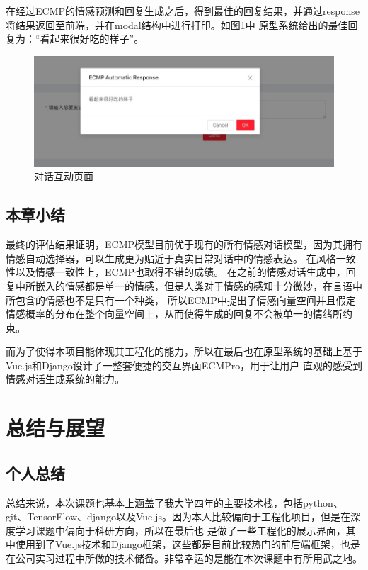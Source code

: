 \documentclass[supercite]{HustGraduPaper}
\theoremstyle{definition}
\begin{document}
在经过ECMP的情感预测和回复生成之后，得到最佳的回复结果，并通过response将结果返回至前端，并在modal结构中进行打印。如图\ref{Fig.chatresponse}中
原型系统给出的最佳回复为：“看起来很好吃的样子”。
\begin{figure}[H] %
  \centering %
  \includegraphics[width=1\textwidth]{images/chatresponse.jpg} %
  \caption{对话互动页面} %
  \label{Fig.chatresponse} %
\end{figure}

\subsection{本章小结}
最终的评估结果证明，ECMP模型目前优于现有的所有情感对话模型，因为其拥有情感自动选择器，可以生成更为贴近于真实日常对话中的情感表达。
在风格一致性以及情感一致性上，ECMP也取得不错的成绩。
在之前的情感对话生成中，回复中所嵌入的情感都是单一的情感，但是人类对于情感的感知十分微妙，在言语中所包含的情感也不是只有一个种类，
所以ECMP中提出了情感向量空间并且假定情感概率的分布在整个向量空间上，从而使得生成的回复不会被单一的情绪所约束。

而为了使得本项目能体现其工程化的能力，所以在最后也在原型系统的基础上基于Vue.js和Django设计了一整套便捷的交互界面ECMPro，用于让用户
直观的感受到情感对话生成系统的能力。


\section{总结与展望}
\subsection{个人总结}
总结来说，本次课题也基本上涵盖了我大学四年的主要技术栈，包括python、git、TensorFlow、django以及Vue.js。因为本人比较偏向于工程化项目，但是在深度学习课题中偏向于科研方向，所以在最后也
是做了一些工程化的展示界面，其中使用到了Vue.js技术和Django框架，这些都是目前比较热门的前后端框架，也是在公司实习过程中所做的技术储备。非常幸运的是能在本次课题中有所用武之地。
\end{document}
